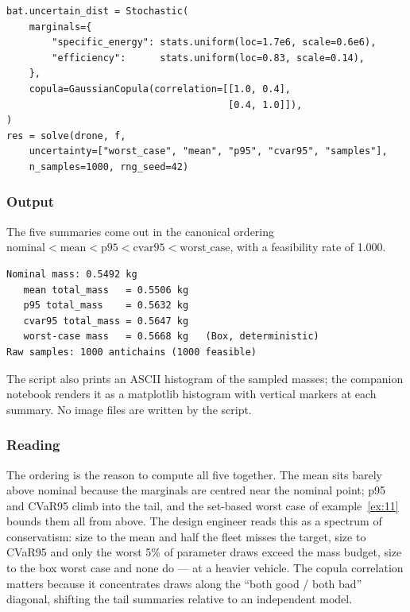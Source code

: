 \documentclass[11pt,a4paper]{article}
\begin{document}
\begin{lstlisting}
bat.uncertain_dist = Stochastic(
    marginals={
        "specific_energy": stats.uniform(loc=1.7e6, scale=0.6e6),
        "efficiency":      stats.uniform(loc=0.83, scale=0.14),
    },
    copula=GaussianCopula(correlation=[[1.0, 0.4],
                                       [0.4, 1.0]]),
)
res = solve(drone, f,
    uncertainty=["worst_case", "mean", "p95", "cvar95", "samples"],
    n_samples=1000, rng_seed=42)
\end{lstlisting}

\subsubsection*{Output}

The five summaries come out in the canonical ordering
$\text{nominal} < \text{mean} < \text{p95} < \text{cvar95} <
\text{worst\_case}$, with a feasibility rate of 1.000.

\begin{lstlisting}[language={},numbers=none,keywordstyle={}]
Nominal mass: 0.5492 kg
   mean total_mass   = 0.5506 kg
   p95 total_mass    = 0.5632 kg
   cvar95 total_mass = 0.5647 kg
   worst-case mass   = 0.5668 kg   (Box, deterministic)
Raw samples: 1000 antichains (1000 feasible)
\end{lstlisting}

The script also prints an ASCII histogram of the sampled masses; the
companion notebook renders it as a matplotlib histogram with vertical
markers at each summary. No image files are written by the script.

\subsubsection*{Reading}

The ordering is the reason to compute all five together. The mean sits
barely above nominal because the marginals are centred near the nominal
point; p95 and CVaR95 climb into the tail, and the set-based worst case
of example~\ref{ex:11} bounds them all from above. The design engineer
reads this as a spectrum of conservatism: size to the mean and half the
fleet misses the target, size to CVaR95 and only the worst 5\% of
parameter draws exceed the mass budget, size to the box worst case and
none do --- at a heavier vehicle. The copula correlation matters
because it concentrates draws along the ``both good / both bad''
diagonal, shifting the tail summaries relative to an independent model.
\end{document}
